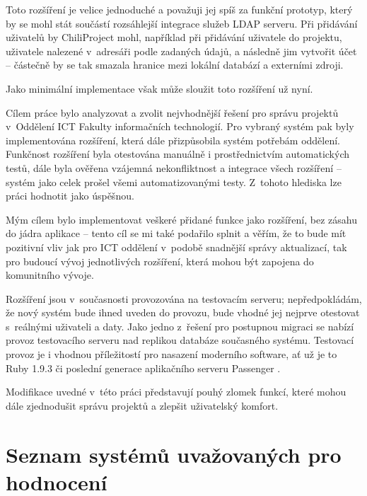 \documentclass[thesis=B,czech]{FITthesis}[2012/05/02]
\begin{document}
Toto rozšíření je velice jednoduché a považuji jej spíš za funkční
prototyp, který by se mohl stát součástí rozsáhlejší integrace služeb
LDAP serveru. Při přidávání uživatelů by ChiliProject mohl, například
při přidávání uživatele do projektu,  uživatele nalezené
v~adresáři podle zadaných údajů, a následně jim vytvořit účet -- částečně
by se tak smazala hranice mezi lokální databází a externími zdroji.

Jako minimální implementace však může sloužit toto rozšíření už nyní.

\begin{conclusion}

Cílem práce bylo analyzovat a zvolit nejvhodnější řešení pro správu projektů v~Oddělení ICT Fakulty informačních technologií. Pro vybraný systém pak byly implementována rozšíření, která dále přizpůsobila systém potřebám oddělení. Funkčnost rozšíření byla otestována manuálně i prostřednictvím automatických testů, dále byla ověřena vzájemná nekonfliktnost a integrace všech rozšíření -- systém jako celek prošel všemi automatizovanými testy. Z~tohoto hlediska lze práci hodnotit jako úspěšnou.

Mým cílem bylo implementovat veškeré přidané funkce jako rozšíření, bez zásahu do jádra aplikace -- tento cíl se mi také podařilo splnit a věřím, že to bude mít pozitivní vliv jak pro \gls{ICT} oddělení v~podobě snadnější správy aktualizací, tak pro budoucí vývoj jednotlivých rozšíření, která mohou být zapojena do komunitního vývoje.

Rozšíření jsou v~současnosti provozována na testovacím serveru; nepředpokládám, že nový systém bude ihned uveden do provozu, bude vhodné jej nejprve otestovat s~reálnými uživateli a daty. Jako jedno z~řešení pro postupnou migraci se nabízí provoz testovacího serveru nad replikou databáze současného systému. Testovací provoz je i vhodnou příležitostí pro nasazení moderního software, ať už je to Ruby 1.9.3 či poslední generace aplikačního serveru Passenger \citep{Passenger32}.

Modifikace uvedné v~této práci představují pouhý zlomek funkcí, které mohou dále zjednodušit správu projektů a zlepšit uživatelský komfort.

\end{conclusion}




\appendix

\glsaddall
\printglossaries

\chapter{Seznam systémů uvažovaných pro hodnocení}
\label{chap:seznampm}
\end{document}
